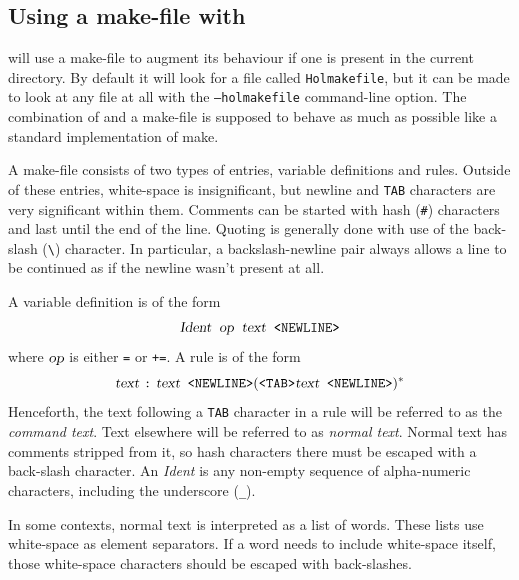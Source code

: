 \subsection{Using a make-file with \holmake}
\label{sec:using-Holmakefiles}

\holmake{} will use a make-file to augment its behaviour if one is
present in the current directory.  By default it will look for a file
called \texttt{Holmakefile}, but it can be made to look at any file at
all with the \texttt{--holmakefile} command-line option.  The
combination of \holmake{} and a make-file is supposed to behave as
much as possible like a standard implementation of \textsf{make}.

A make-file consists of two types of entries, variable definitions and
rules.  Outside of these entries, white-space is insignificant, but
newline and \texttt{TAB} characters are very significant within them.
Comments can be started with hash (\texttt{\#}) characters and last
until the end of the line.  Quoting is generally done with use of the
back-slash (\verb+\+) character.  In particular, a backslash-newline
pair always allows a line to be continued as if the newline wasn't
present at all.

A variable definition is of the form
\[
\textsl{Ident} \;\;\textsl{op}\;\; \textsl{text}\;\;  \texttt{<NEWLINE>}
\]
where $\textsl{op}$ is either \texttt{=} or \texttt{+=}.
A rule is of the form
\[
\textsl{text } \texttt{:} \textsl{ text} \texttt{ <NEWLINE>}
(\texttt{<TAB>}\textsl{text}\texttt{ <NEWLINE>})^*
\]
Henceforth, the text following a \texttt{TAB} character in a rule will
be referred to as the \emph{command text}.  Text elsewhere will be
referred to as \emph{normal text}.  Normal text has comments stripped
from it, so hash characters there must be escaped with a back-slash
character.  An \textsl{Ident} is any non-empty sequence of
alpha-numeric characters, including the underscore (\texttt{\_}).

In some contexts, normal text is interpreted as a list of words.
These lists use white-space as element separators.  If a word needs to
include white-space itself, those white-space characters should be
escaped with back-slashes.

\newcommand{\varref}[1]{\texttt{\$(#1)}}
